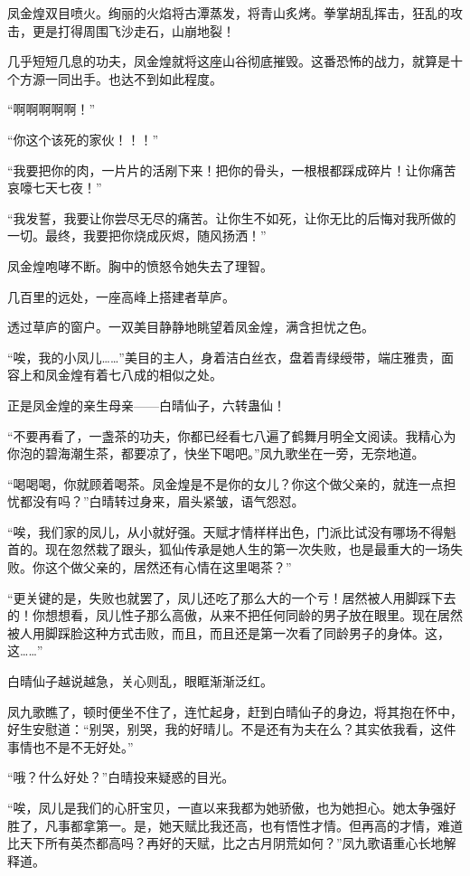 \begin{this_body}
凤金煌双目喷火。绚丽的火焰将古潭蒸发，将青山炙烤。拳掌胡乱挥击，狂乱的攻击，更是打得周围飞沙走石，山崩地裂！

几乎短短几息的功夫，凤金煌就将这座山谷彻底摧毁。这番恐怖的战力，就算是十个方源一同出手。也达不到如此程度。

“啊啊啊啊啊！”

“你这个该死的家伙！！！”

“我要把你的肉，一片片的活剐下来！把你的骨头，一根根都踩成碎片！让你痛苦哀嚎七天七夜！”

“我发誓，我要让你尝尽无尽的痛苦。让你生不如死，让你无比的后悔对我所做的一切。最终，我要把你烧成灰烬，随风扬洒！”

凤金煌咆哮不断。胸中的愤怒令她失去了理智。

几百里的远处，一座高峰上搭建者草庐。

透过草庐的窗户。一双美目静静地眺望着凤金煌，满含担忧之色。

“唉，我的小凤儿……”美目的主人，身着洁白丝衣，盘着青绿绶带，端庄雅贵，面容上和凤金煌有着七八成的相似之处。

正是凤金煌的亲生母亲——白晴仙子，六转蛊仙！

“不要再看了，一盏茶的功夫，你都已经看七八遍了鹤舞月明全文阅读。我精心为你泡的碧海潮生茶，都要凉了，快坐下喝吧。”凤九歌坐在一旁，无奈地道。

“喝喝喝，你就顾着喝茶。凤金煌是不是你的女儿？你这个做父亲的，就连一点担忧都没有吗？”白晴转过身来，眉头紧皱，语气怨怼。

“唉，我们家的凤儿，从小就好强。天赋才情样样出色，门派比试没有哪场不得魁首的。现在忽然栽了跟头，狐仙传承是她人生的第一次失败，也是最重大的一场失败。你这个做父亲的，居然还有心情在这里喝茶？”

“更关键的是，失败也就罢了，凤儿还吃了那么大的一个亏！居然被人用脚踩下去的！你想想看，凤儿性子那么高傲，从来不把任何同龄的男子放在眼里。现在居然被人用脚踩脸这种方式击败，而且，而且还是第一次看了同龄男子的身体。这，这……”

白晴仙子越说越急，关心则乱，眼眶渐渐泛红。

凤九歌瞧了，顿时便坐不住了，连忙起身，赶到白晴仙子的身边，将其抱在怀中，好生安慰道：“别哭，别哭，我的好晴儿。不是还有为夫在么？其实依我看，这件事情也不是不无好处。”

“哦？什么好处？”白晴投来疑惑的目光。

“唉，凤儿是我们的心肝宝贝，一直以来我都为她骄傲，也为她担心。她太争强好胜了，凡事都拿第一。是，她天赋比我还高，也有悟性才情。但再高的才情，难道比天下所有英杰都高吗？再好的天赋，比之古月阴荒如何？”凤九歌语重心长地解释道。


\end{this_body}
